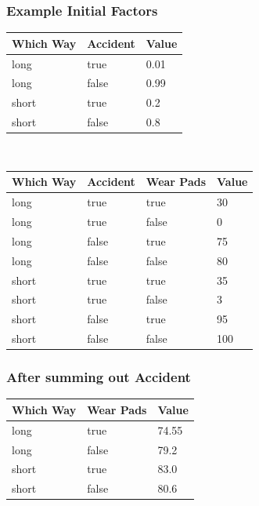 \documentclass[12pt]{beamer} %
\begin{document}
\begin{frame}
\frametitle{Example Initial Factors}
\begin{tabular}{|ll|l|}\hline
Which Way & Accident & Value\\\hline
long & true & 0.01\\
long & false & 0.99\\
short & true & 0.2\\
short & false & 0.8\\\hline
\end{tabular}\\
\begin{tabular}{|lll|l|}\hline
Which Way & Accident & Wear Pads & Value\\\hline
long & true & true & 30\\
long & true & false & 0\\
long & false & true & 75\\
long & false & false & 80\\
short & true & true & 35\\
short & true & false & 3\\
short & false & true & 95\\
short & false & false & 100\\\hline
\end{tabular}
\end{frame}
\begin{frame}
\frametitle{After summing out Accident}
\begin{center}
\begin{tabular}{|ll|l|}\hline
Which Way & Wear Pads & Value\\\hline
long & true & 74.55\\
long & false & 79.2\\
short & true & 83.0\\
short & false & 80.6\\\hline
\end{tabular}
\end{center}
\end{frame}
\end{document}
